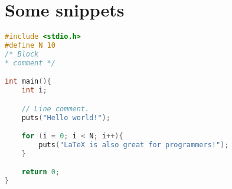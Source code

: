     \section{Some snippets}\label{sec:snippets}
    	\label{snippet:example_code_1}

    \begin{lstlisting}[language=C,caption={Some C code example}]
#include <stdio.h>
#define N 10
/* Block
* comment */

int main(){
    int i;

    // Line comment.
    puts("Hello world!");

    for (i = 0; i < N; i++){
        puts("LaTeX is also great for programmers!");
    }

    return 0;
}    \end{lstlisting}


